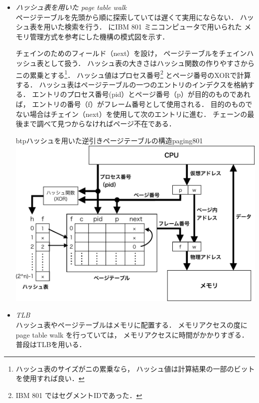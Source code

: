 \begin{itemize}
\item \emph{ハッシュ表を用いた page table walk} \\
  ページテーブルを先頭から順に探索していては遅くて実用にならない．
  ハッシュ表を用いた検索を行う．
  にIBM 801 ミニコンピュータで用いられた
  メモリ管理方式\cite{invertedPageTable}を参考にした機構の模式図を示す．

  チェインのためのフィールド（next）を設け，
  ページテーブルをチェインハッシュ表として扱う．
  ハッシュ表の大きさはハッシュ関数の作りやすさからニの累乗とする\footnote{
    ハッシュ表のサイズがニの累乗なら，
    ハッシュ値は計算結果の一部のビットを使用すれば良い．}．
  ハッシュ値はプロセス番号\footnote{IBM 801 ではセグメントIDであった．}
  とページ番号のXORで計算する．
  ハッシュ表はページテーブルの一つのエントリのインデクスを格納する．
  エントリのプロセス番号(pid）とページ番号（p）が目的のものであれば，
    エントリの番号（f）がフレーム番号として使用される．
    目的のものでない場合はチェイン（next）を使用して次のエントリに進む．
    チェーンの最後まで調べて見つからなければページ不在である．

    \begin{myfig}{btp}{ハッシュを用いた逆引きページテーブルの構造}{paging801}
      \includegraphics[scale=0.66]{Fig/paging801-crop.pdf}
    \end{myfig}

  \item \emph{TLB} \\
    ハッシュ表やページテーブルはメモリに配置する．
    メモリアクセスの度に page table walk を行っていては，
    メモリアクセスに時間がかかりすぎる．
    普段はTLBを用いる．
\end{itemize}

